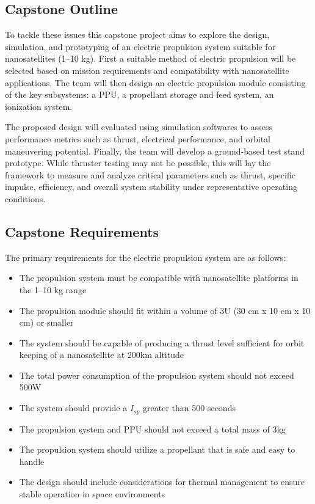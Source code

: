 \subsection{Capstone Outline}
To tackle these issues this capstone project aims to explore the design, simulation, and prototyping of an electric propulsion system suitable for nanosatellites (1–10 kg). First a suitable method of electric propulsion will be selected based on mission requirements and compatibility with nanosatellite applications. The team will then design an electric propulsion module consisting of the key subsystems: a \ac{PPU}, a propellant storage and feed system, an ionization system.

The proposed design will evaluated using simulation softwares to assess performance metrics such as thrust, electrical performance, and orbital maneuvering potential. Finally, the team will develop a ground-based test stand prototype. While thruster testing may not be possible, this will lay the framework to measure and analyze critical parameters such as thrust, specific impulse, efficiency, and overall system stability under representative operating conditions.

\subsection{Capstone Requirements}
The primary requirements for the electric propulsion system are as follows:
\begin{itemize}
    \item The propulsion system must be compatible with nanosatellite platforms in the 1–10 kg range
    \item The propulsion module should fit within a volume of 3U (30 cm x 10 cm x 10 cm) or smaller
    \item The system should be capable of producing a thrust level sufficient for orbit keeping of a nanosatellite at 200km altitude
    \item The total power consumption of the propulsion system should not exceed 500W
    \item The system should provide a $I_{sp}$ greater than 500 seconds
    \item The propulsion system and \ac{PPU} should not exceed a total mass of 3kg
    \item The propulsion system should utilize a propellant that is safe and easy to handle
    \item The design should include considerations for thermal management to ensure stable operation in space environments
\end{itemize}

